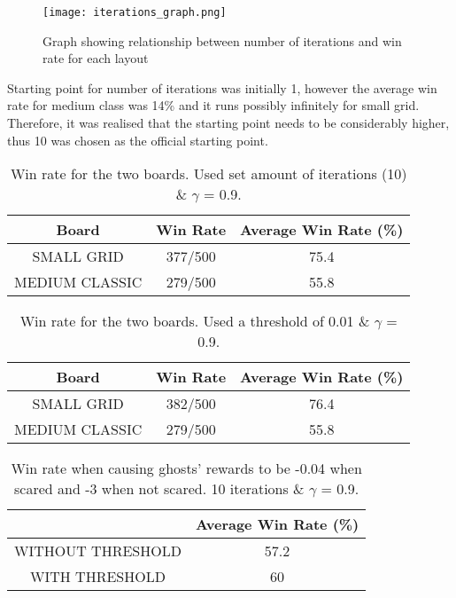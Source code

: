 \documentclass[12pt]{report}
\begin{document}
        \begin{figure}[H]
          \centering
          \texttt{[image: iterations\_graph.png]}
          \caption{Graph showing relationship between number of iterations and win rate for each layout}
        \end{figure}
        Starting point for number of iterations was initially 1, however the average win rate for medium class was 14\% and it runs possibly infinitely for small grid. Therefore, it was realised that the starting point needs to be considerably higher, thus 10 was chosen as the official starting point.
        \begin{table}[h!]
          \begin{center}
            \begin{tabular}{c|c|c}
              \textbf{Board} & \textbf{Win Rate} & \textbf{Average Win Rate (\%)} \\
              \hline
              SMALL GRID & 377/500 & 75.4\\
              MEDIUM CLASSIC & 279/500 & 55.8\\
            \end{tabular}
            \caption{Win rate for the two boards. Used set amount of iterations (10) \& $\gamma$ = 0.9.}
            \label{tab:table2}
          \end{center}
        \end{table}

        \begin{table}[h!]
          \begin{center}
            \begin{tabular}{c|c|c}
              \textbf{Board} & \textbf{Win Rate} & \textbf{Average Win Rate (\%)} \\
              \hline
              SMALL GRID & 382/500 & 76.4\\
              MEDIUM CLASSIC & 279/500 & 55.8\\
            \end{tabular}
            \caption{Win rate for the two boards. Used a threshold of 0.01 \& $\gamma$ = 0.9.}
            \label{tab:table3}
          \end{center}
        \end{table}

        \begin{table}[h!]
          \begin{center}
            \begin{tabular}{c|c}
              \textbf{} & \textbf{Average Win Rate (\%)} \\
              \hline
              WITHOUT THRESHOLD & 57.2\\
              WITH THRESHOLD & 60\\
            \end{tabular}
            \caption{Win rate when causing ghosts' rewards to be -0.04 when scared and -3 when not scared. 10 iterations \& $\gamma$ = 0.9.}
            \label{tab:table4}
          \end{center}
        \end{table}
\end{document}
